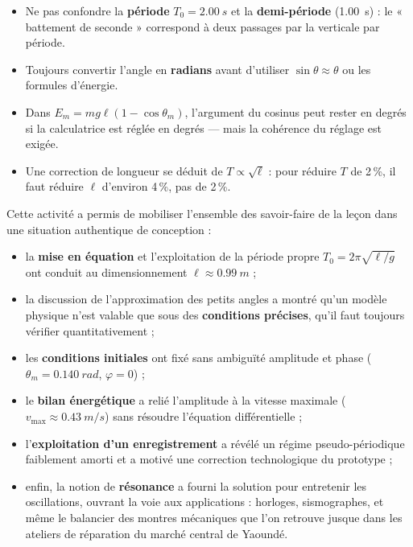 \documentclass[11pt]{article}
\newcounter{popsec}
\newcounter{popsub}
\newcommand{\courssub}[1]{%
  \stepcounter{popsub}%
  \par\vspace{9pt}\noindent{\popxbold\fontsize{11.5}{13}\selectfont\color{popink}{\color{poporange}\thepopsec.\thepopsub}\hspace{6pt}#1}\par\nopagebreak\vspace{4pt}
}
\begin{document}
\begin{attention}
\begin{itemize}
\item Ne pas confondre la \textbf{période} $T_0 = \SI{2,00}{s}$ et la \textbf{demi-période} (\SI{1,00}{s}) : le « battement de seconde » correspond à deux passages par la verticale par période.
\item Toujours convertir l'angle en \textbf{radians} avant d'utiliser $\sin\theta \approx \theta$ ou les formules d'énergie.
\item Dans $E_m = mg\ell(1-\cos\theta_m)$, l'argument du cosinus peut rester en degrés si la calculatrice est réglée en degrés — mais la cohérence du réglage est exigée.
\item Une correction de longueur se déduit de $T \propto \sqrt{\ell}$ : pour réduire $T$ de \num{2}\,\%, il faut réduire $\ell$ d'environ \num{4}\,\%, pas de \num{2}\,\%.
\end{itemize}
\end{attention}

\courssub{Bilan de l'activité}

Cette activité a permis de mobiliser l'ensemble des savoir-faire de la leçon dans une situation authentique de conception :
\begin{itemize}
\item la \textbf{mise en équation} et l'exploitation de la période propre $T_0 = 2\pi\sqrt{\ell/g}$ ont conduit au dimensionnement $\ell \approx \SI{0,99}{m}$ ;
\item la discussion de l'approximation des petits angles a montré qu'un modèle physique n'est valable que sous des \textbf{conditions précises}, qu'il faut toujours vérifier quantitativement ;
\item les \textbf{conditions initiales} ont fixé sans ambiguïté amplitude et phase ($\theta_m = \SI{0,140}{rad}$, $\varphi = 0$) ;
\item le \textbf{bilan énergétique} a relié l'amplitude à la vitesse maximale ($v_{\max} \approx \SI{0,43}{m/s}$) sans résoudre l'équation différentielle ;
\item l'\textbf{exploitation d'un enregistrement} a révélé un régime pseudo-périodique faiblement amorti et a motivé une correction technologique du prototype ;
\item enfin, la notion de \textbf{résonance} a fourni la solution pour entretenir les oscillations, ouvrant la voie aux applications : horloges, sismographes, et même le balancier des montres mécaniques que l'on retrouve jusque dans les ateliers de réparation du marché central de Yaoundé.
\end{itemize}
\end{document}
